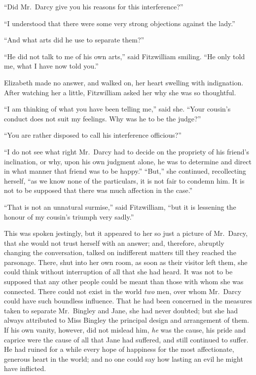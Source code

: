 “Did Mr.\ Darcy give you his reasons for this
interference?”

“I understood that there were some very strong objections
against the lady.”

“And what arts did he use to separate them?”

“He did not talk to me of his own arts,” said Fitzwilliam
smiling. “He only told me, what I have now
told you.”

Elizabeth made no answer, and walked on, her heart
swelling with indignation. After watching her a little,
Fitz\-william asked her why she was so thoughtful.

“I am thinking of what you have been telling me,”
said she. “Your cousin’s conduct does not suit my
feelings. Why was he to be the judge?”

“You are rather disposed to call his interference
officious?”

“I do not see what right Mr.\ Darcy had to decide on
the propriety of his friend’s inclination, or why, upon his
own judgment alone, he was to determine and direct in
what manner that friend was to be happy.” “But,” she
continued, recollecting herself, “as we know none of the
particulars, it is not fair to condemn him. It is not to
be supposed that there was much affection in the case.”

“That is not an unnatural surmise,” said Fitz\-william,
“but it is lessening the honour of my cousin’s triumph
very sadly.”

This was spoken jestingly, but it appeared to her so
just a picture of Mr.\ Darcy, that she would not trust
herself with an answer; and, therefore, abruptly changing
the conversation, talked on indifferent matters till they
reached the parsonage. There, shut into her own room,
as soon as their visitor left them, she could think without
interruption of all that she had heard. It was not to be
supposed that any other people could be meant than those
with whom she was connected. There could not exist in
the world \textit{two} men, over whom Mr.\ Darcy could have such
boundless influence. That he had been concerned in the
measures taken to separate Mr.\ Bingley and Jane, she had
never doubted; but she had always attributed to Miss
Bingley the principal design and arrangement of them.
If his own vanity, however, did not mislead him, \textit{he} was
the cause, his pride and caprice were the cause of all
that Jane had suffered, and still continued to suffer. He
had ruined for a while every hope of happiness for the most
affectionate, generous heart in the world; and no one
could say how lasting an evil he might have inflicted.

